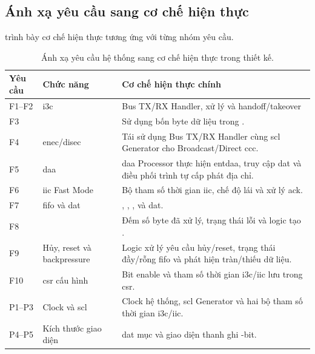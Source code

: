 \subsection{Ánh xạ yêu cầu sang cơ chế hiện thực}
\label{sec:arch-flow}

 trình bày cơ chế hiện thực tương ứng với từng nhóm yêu cầu.

\begin{table}[!htbp]
	\centering
	\caption{Ánh xạ yêu cầu hệ thống sang cơ chế hiện thực trong thiết kế.}
	\label{tab:req-impl-map}
	\begin{tabular}{C{1.8cm} L{5.0cm} L{6.2cm}}
		\toprule
		\textbf{Yêu cầu} & \textbf{Chức năng}            & \textbf{Cơ chế hiện thực chính}                                                                        \\
		\midrule
		F1--F2           & \gls{i3c} \PrivateWriteRead{} & Bus TX/RX Handler, xử lý \TBit{} và handoff/takeover                                                   \\
		F3               & \ImmediateDataTransfer{}      & Sử dụng bốn byte dữ liệu trong \CommandDescriptor{}.                                                   \\
		F4               & \gls{enec}/\gls{disec}        & Tái sử dụng Bus TX/RX Handler cùng \gls{scl} Generator cho Broadcast/Direct \gls{ccc}.                 \\
		F5               & \acrfull{daa}                 & \gls{daa} Processor thực hiện \gls{entdaa}, truy cập \gls{dat} và điều phối trình tự cấp phát địa chỉ. \\
		F6               & \gls{iic} Fast Mode           & Bộ tham số thời gian \gls{iic}, chế độ lái \OpenDrain{} và xử lý \gls{ack}.                            \\
		F7               & \gls{fifo} và \gls{dat}       & \CommandFifo{}, \TxFifo{}, \RxFifo{}, \ResponseFifo{} và \gls{dat}.                                    \\
		F8               & \ResponseDescriptor{}         & Đếm số byte đã xử lý, trạng thái lỗi và logic tạo \ResponseDescriptor{}.                               \\
		F9               & Hủy, reset và backpressure    & Logic xử lý yêu cầu hủy/reset, trạng thái đầy/rỗng \gls{fifo} và phát hiện tràn/thiếu dữ liệu.         \\
		F10              & \gls{csr} cấu hình            & Bit enable và tham số thời gian \gls{i3c}/\gls{iic} lưu trong \gls{csr}.                               \\
		P1--P3           & Clock và \gls{scl}            & Clock hệ thống, \gls{scl} Generator và hai bộ tham số thời gian \gls{i3c}/\gls{iic}.                   \\
		P4--P5           & Kích thước giao diện          & \gls{dat} \DatEntryCount{} mục và giao diện thanh ghi \RegisterDataWidth{}-bit.                        \\
		\bottomrule
	\end{tabular}
\end{table}

